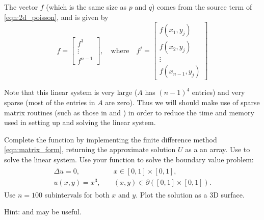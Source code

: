The vector $f$ (which is the same size as $p$ and $q$) comes from the source term of \eqref{eqn:2d_poisson}, and is given by 
\[f = \begin{bmatrix} f^1 \\ \vdots \\ f^{n-1} \end{bmatrix}, \quad  \text{where} \quad f^j = \begin{bmatrix} f(x_1,y_j) \\ f(x_2,y_j) \\ \vdots \\ f(x_{n-1},y_j) \end{bmatrix}\]

Note that this linear system is very large ($A$ has $(n-1)^4$ entries) and very sparse (most of the entries in $A$ are zero).
Thus we will should make use of sparse matrix routines (such as those in  and ) in order to reduce the time and memory used in setting up and solving the linear system.

\begin{problem}
Complete the function  by implementing the finite difference method \eqref{eqn:matrix_form}, returning the approximate solution $U$ as a an array.
Use  to solve the linear system.
Use your function to solve the boundary value problem:
\begin{align}
	\begin{split}
	\Delta u = 0, &{}\quad x \in [0,1]\times [0,1],\\
	u(x,y) = x^3, &{}\quad (x,y) \in \partial ([0,1]\times [0,1]).
	\end{split}
	\label{poisson2d:laplace}
\end{align}
Use $n=100$ subintervals for both $x$ and $y$.
Plot the solution as a 3D surface.

Hint:  and  may be useful.
\label{poisson:prob:poisson_square}
\end{problem}

